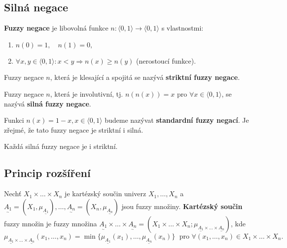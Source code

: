 {\subsection{Silná negace}
\begin{definition}
\textbf{Fuzzy negace} je libovolná funkce $n:\langle 0,1\rangle \rightarrow \langle 0,1\rangle$ s vlastnostmi:
\begin{enumerate}
\item $n(0) = 1, \quad n(1) = 0,$
\item $\forall x,y \in \langle 0,1\rangle:  x<y \Rightarrow n(x) \geq n(y)$ (nerostoucí funkce). 
\end{enumerate}
\end{definition}

\begin{definition}
Fuzzy negace $n$, která je klesající a spojitá se nazývá \textbf{striktní fuzzy negace}.
\end{definition}

\begin{definition}
Fuzzy negace $n$, která je involutivní, tj. $n(n(x))=x$ pro $\forall x \in \langle 0,1\rangle$, se nazývá \textbf{silná fuzzy negace}.
\end{definition}

\begin{remark}
Funkci $n(x)=1-x, x \in \langle 0,1\rangle$ budeme nazývat \textbf{standardní fuzzy negací}. Je zřejmé, že tato fuzzy negace je striktní i silná.  
\end{remark}

\begin{theorem}
Každá silná fuzzy negace je i striktní.
\end{theorem}



\subsection{Princip rozšíření}

\begin{definition}
Nechť $X_1 \times \ldots \times X_n$ je kartézský součin univerz $X_1, \ldots, X_n$ a $\underset{^\sim}{A_1} = (X_1, \mu_{\underset{^\sim}{A_1}}), \ldots, \underset{^\sim}{A_n} = (X_n, \mu_{\underset{^\sim}{A_n}})$ jsou fuzzy množiny. \textbf{Kartézský součin} fuzzy množin je fuzzy množina $\underset{^\sim}{A_1} \times \ldots \times \underset{^\sim}{A_n} = (X_1 \times \ldots \times X_n; \mu_{\underset{^\sim}{A_1} \times \ldots \times \underset{^\sim}{A_n}})$, kde
\begin{equation*}
\mu_{\underset{^\sim}{A_1} \times \ldots \times \underset{^\sim}{A_n}}(x_1, \ldots, x_n) = \min\lbrace \mu_{\underset{^\sim}{A_1}}(x_1), \ldots, \mu_{\underset{^\sim}{A_n}}(x_n) \rbrace \; \text{ pro } \forall(x_1, \ldots, x_n) \in X_1 \times \ldots \times X_n.
\end{equation*}
\end{definition}

}
